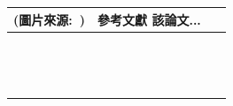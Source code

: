 \begin{table}[h!]
\begin{tabular}{ | m{4.5cm} | m{4.5cm} | m{5.5cm} | }
      (圖片來源:~\cite{Isola2017})
    & 
      參考文獻 \cite{Isola2017} 
      該論文...
    \\ \hline
    ~ & ~ & ~
    \\ \hline
    ~ & ~ & ~
    \\ \hline
    ~ & ~ & ~
    \\ \hline
  \end{tabular}
\end{table}